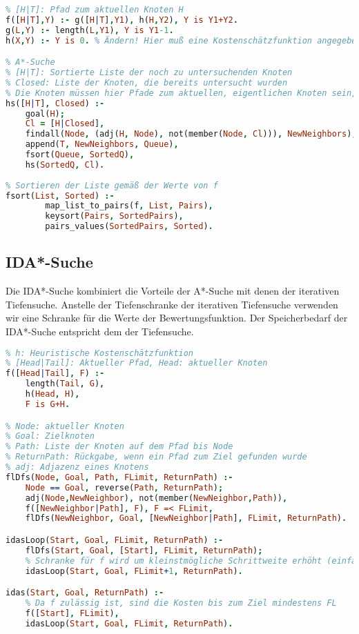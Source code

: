 \begin{lstlisting}[language=Prolog]
% Heuristische Bewertungsfunktion
% [H|T]: Pfad zum aktuellen Knoten H
f([H|T],Y) :- g([H|T],Y1), h(H,Y2), Y is Y1+Y2.
g(L,Y) :- length(L,Y1), Y is Y1-1.
h(X,Y) :- Y is 0. % Ändern! Hier muß eine Kostenschätzfunktion angegeben werden.

% A*-Suche
% [H|T]: Sortierte Liste der noch zu untersuchenden Knoten
% Closed: Liste der Knoten, die bereits untersucht wurden
% Die Knoten müssen hier Pfade zum aktuellen, eigentlichen Knoten sein, damit f dessen Bewertung berechnen kann.
hs([H|T], Closed) :-
	goal(H);
	Cl = [H|Closed],
	findall(Node, (adj(H, Node), not(member(Node, Cl))), NewNeighbors),
	append(T, NewNeighbors, Queue),
	fsort(Queue, SortedQ),
	hs(SortedQ, Cl).
	
% Sortieren der Liste gemäß der Werte von f
fsort(List, Sorted) :- 
        map_list_to_pairs(f, List, Pairs), 
        keysort(Pairs, SortedPairs), 
        pairs_values(SortedPairs, Sorted). 
\end{lstlisting}

\subsection{IDA*-Suche}
Die IDA*-Suche kombiniert die Vorteile der A*-Suche mit denen der iterativen Tiefensuche. Anstelle der Tiefenschranke der iterativen Tiefensuche verwenden wir eine Schranke für die Werte der Bewertungsfunktion. Der Speicherbedarf der IDA*-Suche entspricht dem der Tiefensuche.

\begin{lstlisting}[language=Prolog]
% f: Heuristische Bewertungsfunktion
% h: Heuristische Kostenschätzfunktion
% [Head|Tail]: Aktueller Pfad, Head: aktueller Knoten 
f([Head|Tail], F) :- 
	length(Tail, G),
	h(Head, H),
	F is G+H. 

% Node: aktueller Knoten
% Goal: Zielknoten
% Path: Liste der Knoten auf dem Pfad bis Node
% ReturnPath: Rückgabe, wenn ein Pfad zum Ziel gefunden wurde
% adj: Adjazenz eines Knotens
flDfs(Node, Goal, Path, FLimit, ReturnPath) :-
	Node == Goal, reverse(Path, ReturnPath);
	adj(Node,NewNeighbor), not(member(NewNeighbor,Path)),
	f([NewNeighbor|Path], F), F =< FLimit,
	flDfs(NewNeighbor, Goal, [NewNeighbor|Path], FLimit, ReturnPath).

idasLoop(Start, Goal, FLimit, ReturnPath) :-
	flDfs(Start, Goal, [Start], FLimit, ReturnPath);
	% Schranke für f wird um kleinstmögliche Schrittweite erhöht (einfach zu programmieren). Sie wird also erhöht, wenn Ziel noch nicht gefunden wurde, um den Radius zu erhöhen.
	idasLoop(Start, Goal, FLimit+1, ReturnPath).

idas(Start, Goal, ReturnPath) :-
	% Da f zulässig ist, sind die Kosten bis zum Ziel mindestens FL
	f([Start], FLimit),
	idasLoop(Start, Goal, FLimit, ReturnPath).
\end{lstlisting}

